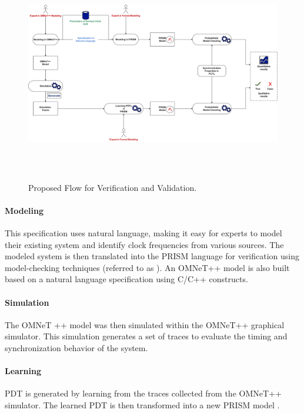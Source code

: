 

\begin{figure}[!htb]
    \centering
    		\includegraphics[width=460pt, height =270pt]{workflow.pdf}
    \caption{Proposed Flow for Verification and Validation.}
    \label{fig:workflow}
\end{figure} 
\paragraph{Modeling} This specification uses natural language, making it easy for experts to model their existing system and identify clock frequencies from various sources. The modeled system is then translated into the PRISM language for verification using model-checking techniques (referred to as ). An OMNeT++ model is also built based on a natural language specification using C/C++ constructs. 

\paragraph{Simulation} The OMNeT ++ model was then simulated within the OMNeT++ graphical simulator. This simulation generates a set of traces to evaluate the timing and synchronization behavior of the system.



\paragraph{Learning} PDT is generated by learning from the traces collected from the OMNeT++ simulator. The learned PDT is then transformed into a new PRISM model .

